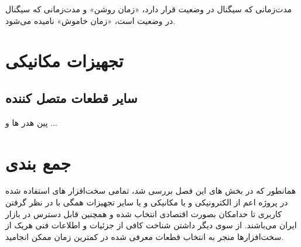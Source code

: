 مدت‌زمانی که سیگنال در وضعیت  قرار دارد، «زمان روشن» و مدت‌زمانی که سیگنال در وضعیت  است، «زمان خاموش»  نامیده می‌شود.

\section{تجهیزات مکانیکی}

\subsection{سایر قطعات متصل کننده}
پین هدر ها و ...

\section{جمع بندی}
همانطور که در بخش های این فصل بررسی شد، تمامی سخت‌افزار های استفاده شده در پروژه اعم از الکترونیکی و یا مکانیکی و یا سایر تجهیزات همگی با در نظر گرفتن کاربری تا حدامکان بصورت اقتصادی انتخاب شده و همچنین قابل دسترس در بازار ایران می‌باشند.
از سوی دیگر داشتن شناخت کافی از جزئیات و اطلاعات فنی هریک از سخت‌افزار‌ها منجر به انتخاب  قطعات معرفی شده در کمترین زمان ممکن انجامید.

